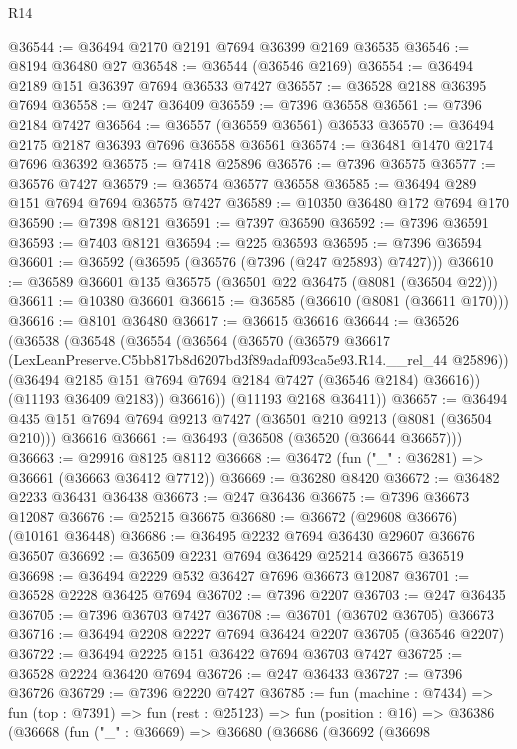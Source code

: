 \begin{lexlean}{R14}
\begin{coremodule}
@36544 := @36494 @2170 @2191 @7694 @36399 @2169 @36535
@36546 := @8194 @36480 @27
@36548 := @36544 (@36546 @2169)
@36554 := @36494 @2189 @151 @36397 @7694 @36533 @7427
@36557 := @36528 @2188 @36395 @7694
@36558 := @247 @36409
@36559 := @7396 @36558
@36561 := @7396 @2184 @7427
@36564 := @36557 (@36559 @36561) @36533
@36570 := @36494 @2175 @2187 @36393 @7696 @36558 @36561
@36574 := @36481 @1470 @2174 @7696 @36392
@36575 := @7418 @25896
@36576 := @7396 @36575
@36577 := @36576 @7427
@36579 := @36574 @36577 @36558
@36585 := @36494 @289 @151 @7694 @7694 @36575 @7427
@36589 := @10350 @36480 @172 @7694 @170
@36590 := @7398 @8121
@36591 := @7397 @36590
@36592 := @7396 @36591
@36593 := @7403 @8121
@36594 := @225 @36593
@36595 := @7396 @36594
@36601 := @36592 (@36595 (@36576 (@7396 (@247 @25893) @7427)))
@36610 := @36589 @36601 @135 @36575 (@36501 @22 @36475 (@8081 (@36504 @22)))
@36611 := @10380 @36601
@36615 := @36585 (@36610 (@8081 (@36611 @170)))
@36616 := @8101 @36480
@36617 := @36615 @36616
@36644 := @36526
    (@36538
      (@36548
        (@36554
          (@36564
            (@36570
              (@36579
                @36617
                (LexLeanPreserve.C5bb817b8d6207bd3f89adaf093ca5e93.R14.__rel_44 @25896))
              (@36494 @2185 @151 @7694 @7694 @2184 @7427 (@36546 @2184) @36616))
            (@11193 @36409 @2183))
          @36616))
      (@11193 @2168 @36411))
@36657 := @36494 @435 @151 @7694 @7694 @9213 @7427 (@36501 @210 @9213 (@8081 (@36504 @210))) @36616
@36661 := @36493 (@36508 (@36520 (@36644 @36657)))
@36663 := @29916 @8125 @8112
@36668 := @36472 (fun ("_" : @36281) => @36661 (@36663 @36412 @7712))
@36669 := @36280 @8420
@36672 := @36482 @2233 @36431 @36438
@36673 := @247 @36436
@36675 := @7396 @36673 @12087
@36676 := @25215 @36675
@36680 := @36672 (@29608 @36676) (@10161 @36448)
@36686 := @36495 @2232 @7694 @36430 @29607 @36676 @36507
@36692 := @36509 @2231 @7694 @36429 @25214 @36675 @36519
@36698 := @36494 @2229 @532 @36427 @7696 @36673 @12087
@36701 := @36528 @2228 @36425 @7694
@36702 := @7396 @2207
@36703 := @247 @36435
@36705 := @7396 @36703 @7427
@36708 := @36701 (@36702 @36705) @36673
@36716 := @36494 @2208 @2227 @7694 @36424 @2207 @36705 (@36546 @2207)
@36722 := @36494 @2225 @151 @36422 @7694 @36703 @7427
@36725 := @36528 @2224 @36420 @7694
@36726 := @247 @36433
@36727 := @7396 @36726
@36729 := @7396 @2220 @7427
@36785 := fun (machine : @7434) =>
  fun (top : @7391) =>
  fun (rest : @25123) =>
  fun (position : @16) =>
  @36386
    (@36668
      (fun ("_" : @36669) =>
      @36680
        (@36686
          (@36692
            (@36698

\end{coremodule}
\end{lexlean}
